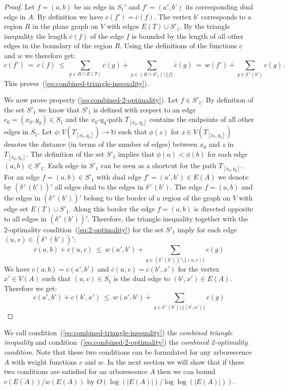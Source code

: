 \documentclass[a4paper, 11pt]{article}
\begin{document}
\begin{proof}
Let $f=(a,b)$ be an edge in $S_1'$ and $f'=(a',b')$ its corresponding dual edge in $A$. By definition we have $c(f') = \overline c(f)$. 
The vertex $b'$ corresponds to a region $R$ in the plane graph on $V$ with edges $E(T) \cup S'_1$. 
By the triangle inequality the length $\overline c(f)$ of the edge $f$ is bounded by the length of all other edges in the boundary of the region $R$. 
Using the definitions of the functions $c$ and $w$ we therefore get: 
\[ c(f') ~=~ \overline c(f)  ~\le~ \sum_{g\in R\cap E(T)} \overline c(g) +  \sum_{g\in (R\cap S'_1) \setminus\{f\}} \overline c(g) 
         ~=~ w(f') + \sum_{g\in \delta^+(b')} c(g).\]
This proves~(\ref{eq:combined-triangle-inequality}). 

 
We now prove property (\ref{eq:combined-2-optimality}). Let $f\in S'_1$. By definition of the set $S'_1$ we know that $S'_1$ is defined with 
respect to an edge $e_0=(x_0,y_0) \in S_1$ and the $x_0$-$y_0$-path $T_{[x_0,y_0]}$ contains the endpoints of all other edges in $S_1$. 
Let $\phi : V(T_{[x_0,y_0]}) \to\mathbb{N}$ such that $\phi(z)$ for $z \in  V(T_{[x_0,y_0]})$ denotes the distance 
(in terms of the number of edges) between $x_0$ and $z$ in $T_{[x_0,y_0]}$. The definition of the set $S'_1$ implies that $\phi(a) < \phi(b)$
for each edge $(a,b) \in S'_1$. Each edge in $S'_1$ can be seen as a shortcut for the path $T_{[x_0,y_0]}$. 
For an edge $f=(a,b)\in S'_1$ with dual edge $f'=(a',b') \in E(A)$ we denote by $\left(\delta^+(b')\right)'$
all edges dual to the edges in $\delta^+(b')$. The edge $f=(a,b)$ and the edges in $\left(\delta^+(b')\right)'$
belong to the border
of a region of the graph on $V$ with edge set $E(T) \cup S'_1$. Along this border the edge $f=(a,b)$ is directed opposite to all edges 
in $\left(\delta^+(b')\right)'$. Therefore, the triangle inequality together with the 2-optimality condition~(\ref{eq:2-optimality})
for the set $S'_1$ imply for each edge $(u,v)\in \left(\delta^+(b')\right)'$:
\[ \overline c(a,b) + \overline c (u,v) ~\le~ w(a',b') + \sum_{g\in \left(\delta^+(b')\right)' \setminus \{(u,v)\}} \overline c(g) \]
We have $\overline c(a,b) = c(a',b')$ and $\overline c(u,v) = c(b', x')$ for the vertex $x'\in V(A)$ such that $(u,v)\in S_1$ 
is the dual edge to $(b', x')\in E(A)$. 
Therefore we get:
\[ c(a',b') + c (b',x') ~\le~ w(a',b') + \sum_{g\in \delta^+(b') \setminus \{(b',x')\}} c(g) \]
\end{proof}



We call condition~(\ref{eq:combined-triangle-inequality}) the \emph{combined triangle inequality} and 
condition~(\ref{eq:combined-2-optimality}) the \emph{combined 2-optimality condition}.
Note that these two conditions can be formulated for any arborescence $A$ with weight functions $c$ and $w$. 
In the next section we will show that if these two conditions are satisfied for an arborescence $A$ then we can bound  $c(E(A))/w(E(A))$
by $O(\log(|E(A)|) / \log \log(|E(A)|))$.
\end{document}
